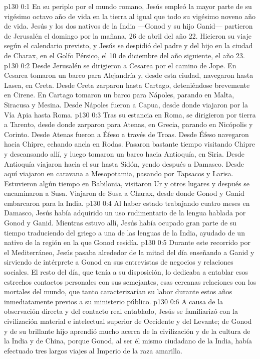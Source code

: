 \author{Comisión de seres intermedios}
\vs p130 0:1 En su periplo por el mundo romano, Jesús empleó la mayor parte de su vigésimo octavo año de vida en la tierra al igual que todo su vigésimo noveno año de vida. Jesús y los dos nativos de la India ---Gonod y su hijo Ganid--- partieron de Jerusalén el domingo por la mañana, 26 de abril del año 22. Hicieron su viaje según el calendario previsto, y Jesús se despidió del padre y del hijo en la ciudad de Charax, en el Golfo Pérsico, el 10 de diciembre del año siguiente, el año 23.
\vs p130 0:2 \pc Desde Jerusalén se dirigieron a Cesarea por el camino de Jope. En Cesarea tomaron un barco para Alejandría y, desde esta ciudad, navegaron hasta Lasea, en Creta. Desde Creta zarparon hasta Cartago, deteniéndose brevemente en Cirene. En Cartago tomaron un barco para Nápoles, parando en Malta, Siracusa y Mesina. Desde Nápoles fueron a Capua, desde donde viajaron por la Vía Apia hasta Roma.
\vs p130 0:3 Tras su estancia en Roma, se dirigieron por tierra a Tarento, desde donde zarparon para Atenas, en Grecia, parando en Nicópolis y Corinto. Desde Atenas fueron a Éfeso a través de Troas. Desde Éfeso navegaron hacia Chipre, echando ancla en Rodas. Pasaron bastante tiempo visitando Chipre y descansando allí, y luego tomaron un barco hacia Antioquía, en Siria. Desde Antioquía viajaron hacia el sur hasta Sidón, yendo después a Damasco. Desde aquí viajaron en caravana a Mesopotamia, pasando por Tapsacos y Larisa. Estuvieron algún tiempo en Babilonia, visitaron Ur y otros lugares y después se encaminaron a Susa. Viajaron de Susa a Charax, desde donde Gonod y Ganid embarcaron para la India.
\vs p130 0:4 \pc Al haber estado trabajando cuatro meses en Damasco, Jesús había adquirido un uso rudimentario de la lengua hablada por Gonod y Ganid. Mientras estuvo allí, Jesús había ocupado gran parte de su tiempo traduciendo del griego a una de las lenguas de la India, ayudado de un nativo de la región en la que Gonod residía.
\vs p130 0:5 \pc Durante este recorrido por el Mediterráneo, Jesús pasaba alrededor de la mitad del día enseñando a Ganid y sirviendo de intérprete a Gonod en sus entrevistas de negocios y relaciones sociales. El resto del día, que tenía a su disposición, lo dedicaba a entablar esos estrechos contactos personales con sus semejantes, esas cercanas relaciones con los mortales del mundo, que tanto caracterizarían su labor durante estos años inmediatamente previos a su ministerio público.
\vs p130 0:6 A causa de la observación directa y del contacto real entablado, Jesús se familiarizó con la civilización material e intelectual superior de Occidente y del Levante; de Gonod y de su brillante hijo aprendió mucho acerca de la civilización y de la cultura de la India y de China, porque Gonod, al ser él mismo ciudadano de la India, había efectuado tres largos viajes al Imperio de la raza amarilla.
